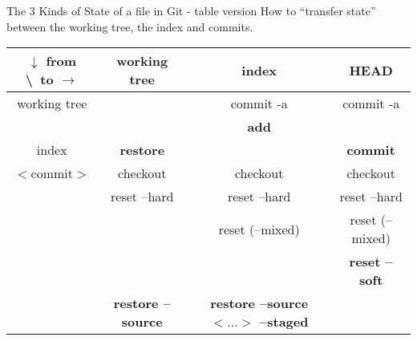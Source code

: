 \documentclass[8pt,utf8]{beamer}
\begin{document}
\begin{frame}{The 3 Kinds of State of a file in Git - table version}
  How to ``transfer state'' between the working tree, the index and commits.


\begin{tabular}{|c|c|c|c|}
    \hline
    $\downarrow$ from \textbackslash \   to $\rightarrow$ & working tree  & index & HEAD \\
    \hline
    working tree &                              & commit -a        & commit -a\footnotemark[1] \\
                                                          &                              & \textbf{add}     &                           \\
    \hline
    index        & \textbf{restore}             &                  & \textbf{commit}        \\
    \hline
    $<$commit$>$     &  checkout\footnotemark[3]    & checkout         & checkout      \\
                                                          &  reset --hard                & reset --hard         & reset --hard  \\
                                                          &                              & reset (--mixed)\footnotemark[2]    & reset (--mixed) \\
                                                          &                              &                       & \textbf{reset --soft}\footnotemark[4]  \\
                                                          &  \textbf{restore --source }  &  \textbf{restore --source $<...>$ --staged}\footnotemark[2] &                \\
    \hline
  \end{tabular}
\end{frame}
\end{document}
